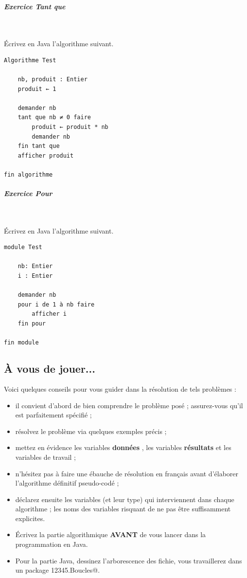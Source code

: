 \documentclass[11pt,a4paper]{article}
\begin{document}
		\subparagraph{Exercice Tant que} 
		
					\textcolor{white}{.} \par
				
					\'Ecrivez en Java l'algorithme suivant.
				
            \par
        \begin{verbatim}
Algorithme Test

    nb, produit : Entier
    produit ← 1 

    demander nb
    tant que nb ≠ 0 faire
        produit ← produit * nb
        demander nb 
    fin tant que
    afficher produit
    
fin algorithme
			    \end{verbatim}
			
		\subparagraph{Exercice Pour} 
		
					\textcolor{white}{.} \par
				
					\'Ecrivez en Java l'algorithme suivant.
				
            \par
        \begin{verbatim}
module Test

    nb: Entier
    i : Entier

    demander nb
    pour i de 1 à nb faire
        afficher i
    fin pour

fin module
			     \end{verbatim}\subsection{\`A vous de jouer...}
          Voici quelques conseils pour vous guider dans la r\'esolution de tels probl\`emes :
          
					\begin{itemize}
				
			\item il convient d'abord de bien comprendre le probl\`eme pos\'e ; assurez-vous qu'il est parfaitement sp\'ecifi\'e ;
			\item r\'esolvez le probl\`eme via quelques exemples pr\'ecis ;
			\item mettez en \'evidence les variables \textbf{\guillemotleft  donn\'ees \guillemotright }, les variables \textbf{\guillemotleft  r\'esultats \guillemotright } et les variables de travail ;
			\item n'h\'esitez pas \`a faire une \'ebauche de r\'esolution en fran\c cais avant d'\'elaborer l'algorithme d\'efinitif pseudo-cod\'e ;
			\item d\'eclarez ensuite les variables (et leur type) qui interviennent dans chaque algorithme ; les noms des variables risquant de ne pas \^etre suffisamment explicites.
			\item \'Ecrivez la partie algorithmique \textbf{AVANT} de vous lancer dans la programmation en Java.
			\item Pour la partie Java, dessinez l'arborescence des fichie, vous travaillerez dans un package  \verb@g12345.Boucles@. 
					\end{itemize}
				
\end{document}
